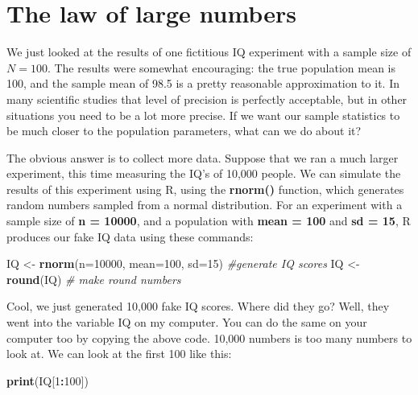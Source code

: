\documentclass[]{book}
\newenvironment{Shaded}{\begin{snugshade}}{\end{snugshade}}
\newcommand{\CommentTok}[1]{\textcolor[rgb]{0.56,0.35,0.01}{\textit{#1}}}
\newcommand{\DataTypeTok}[1]{\textcolor[rgb]{0.13,0.29,0.53}{#1}}
\newcommand{\DecValTok}[1]{\textcolor[rgb]{0.00,0.00,0.81}{#1}}
\newcommand{\KeywordTok}[1]{\textcolor[rgb]{0.13,0.29,0.53}{\textbf{#1}}}
\newcommand{\NormalTok}[1]{#1}
\newcommand{\OperatorTok}[1]{\textcolor[rgb]{0.81,0.36,0.00}{\textbf{#1}}}
\newcommand{\StringTok}[1]{\textcolor[rgb]{0.31,0.60,0.02}{#1}}
\begin{document}
\hypertarget{the-law-of-large-numbers}{%
\section{The law of large numbers}\label{the-law-of-large-numbers}}

We just looked at the results of one fictitious IQ experiment with a sample size of \(N=100\). The results were somewhat encouraging: the true population mean is 100, and the sample mean of 98.5 is a pretty reasonable approximation to it. In many scientific studies that level of precision is perfectly acceptable, but in other situations you need to be a lot more precise. If we want our sample statistics to be much closer to the population parameters, what can we do about it?

The obvious answer is to collect more data. Suppose that we ran a much larger experiment, this time measuring the IQ's of 10,000 people. We can simulate the results of this experiment using R, using the \textbf{rnorm()} function, which generates random numbers sampled from a normal distribution. For an experiment with a sample size of \textbf{n = 10000}, and a population with \textbf{mean = 100} and \textbf{sd = 15}, R produces our fake IQ data using these commands:

\begin{Shaded}
\begin{Highlighting}[]
\NormalTok{IQ <-}\StringTok{ }\KeywordTok{rnorm}\NormalTok{(}\DataTypeTok{n=}\DecValTok{10000}\NormalTok{, }\DataTypeTok{mean=}\DecValTok{100}\NormalTok{, }\DataTypeTok{sd=}\DecValTok{15}\NormalTok{) }\CommentTok{#generate IQ scores}
\NormalTok{IQ <-}\StringTok{ }\KeywordTok{round}\NormalTok{(IQ) }\CommentTok{# make round numbers}
\end{Highlighting}
\end{Shaded}

Cool, we just generated 10,000 fake IQ scores. Where did they go? Well, they went into the variable IQ on my computer. You can do the same on your computer too by copying the above code. 10,000 numbers is too many numbers to look at. We can look at the first 100 like this:

\begin{Shaded}
\begin{Highlighting}[]
\KeywordTok{print}\NormalTok{(IQ[}\DecValTok{1}\OperatorTok{:}\DecValTok{100}\NormalTok{])}
\end{Highlighting}
\end{Shaded}
\end{document}
